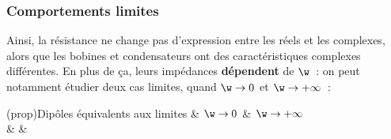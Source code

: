 \documentclass[../../main/main.tex]{subfiles}
\begin{document}
\subsubsection{Comportements limites}
Ainsi, la résistance ne change pas d'expression entre les réels et les
complexes, alors que les bobines et condensateurs ont des caractéristiques
complexes différentes. En plus de ça, leurs impédances \textbf{dépendent} de
$\w$~: on peut notamment étudier deux cas limites, quand $\w\rightarrow0$ et
$\w\rightarrow+\infty$~:
\begin{tcb*}[tabularx*={\renewcommand{\arraystretch}{1.5}}{l|Y|Y}](prop){Dipôles
			équivalents aux limites}
	&
	$\w\rightarrow0$ &
	$\w\rightarrow+\infty$
	\\\hline
	 &
	\smallbreak
	\vspace{-15pt}
	&
	\smallbreak
	\vspace{-15pt}
	\\\hline

\end{tcb*}
\end{document}
